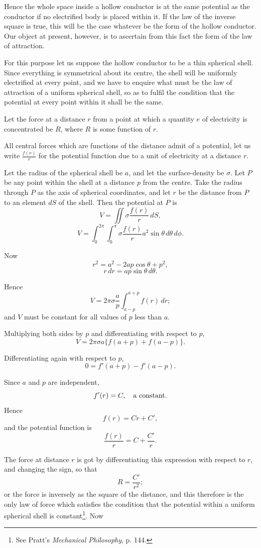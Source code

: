 \documentclass[11pt,a4paper]{article}
\begin{document}
Hence the whole space inside a hollow conductor is at the same potential
as the conductor if no electrified body is placed within it. If the law
of the inverse square is true, this will be the case whatever be the
form of the hollow conductor. Our object at present, however, is to
ascertain from this fact the form of the law of attraction.

For this purpose let us suppose the hollow conductor to be a thin
spherical shell. Since everything is symmetrical about its centre, the
shell will be uniformly electrified at every point, and we have to
enquire what must be the law of attraction of a uniform spherical shell,
so as to fulfil the condition that the potential at every point within
it shall be the same.

\clearpage
\setcounter{footnote}{0}

Let the force at a distance \(r\) from a point at which a quantity \(e\)
of electricity is concentrated be \(R\), where \(R\) is some function of
\(r\).

All central forces which are functions of the distance admit of a
potential, let us write \(\frac{f(r)}{r}\) for the potential function due
to a unit of electricity at a distance \(r\).

Let the radius of the spherical shell be \(a\), and let the
surface-density be \(\sigma\). Let \(P\) be any point within the shell
at a distance \(p\) from the centre. Take the radius through \(P\) as
the axis of spherical coordinates, and let \(r\) be the distance from
\(P\) to an element \(dS\) of the shell. Then the potential at \(P\) is
\[
V=\iint \sigma\frac{f(r)}{r}\,dS,
\]
\[
V=\int_0^{2\pi}\int_0^\pi \sigma\frac{f(r)}{r}a^2\sin\theta\,d\theta\,d\phi.
\]

Now
\[
r^2=a^2-2ap\cos\theta+p^2,
\]
\[
r\,dr=ap\sin\theta\,d\theta.
\]

Hence
\[
V=2\pi\sigma\frac{a}{p}\int_{a-p}^{a+p} f(r)\,dr;
\]
and \(V\) must be constant for all values of \(p\) less than \(a\).

Multiplying both sides by \(p\) and differentiating with respect to \(p\),
\[
V=2\pi\sigma a\{f(a+p)+f(a-p)\}.
\]

Differentiating again with respect to \(p\),
\[
0=f'(a+p)-f'(a-p).
\]

Since \(a\) and \(p\) are independent,
\[
f'(r)=C,\quad \hbox{a constant.}
\]
Hence
\[
f(r)=Cr+C',
\]
and the potential function is
\[
\frac{f(r)}{r}=C+\frac{C'}{r}.
\]

The force at distance \(r\) is got by differentiating this expression
with respect to \(r\), and changing the sign, so that
\[
R=\frac{C'}{r^2};
\]
or the force is inversely as the square of the distance, and this
therefore is the only law of force which satisfies the condition that
the potential within a uniform spherical shell is constant\footnote{See
Pratt's \textit{Mechanical Philosophy}, p. 144.}. Now
\end{document}
